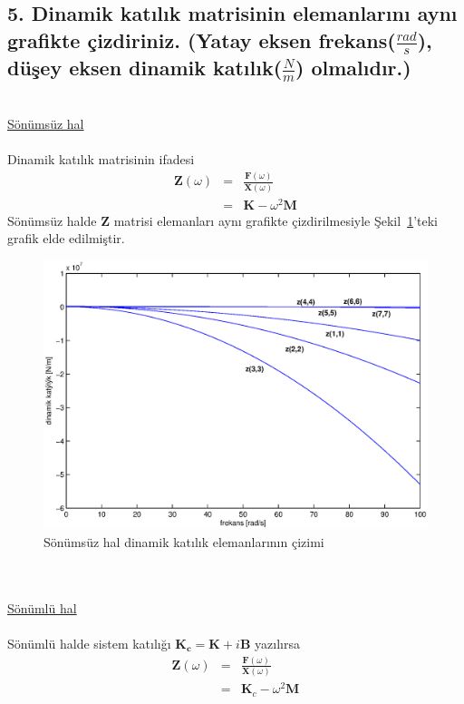 \documentclass[a4paper]{report}
\begin{document}
\subsection*{5. Dinamik katılık matrisinin elemanlarını aynı grafikte çizdiriniz. (Yatay eksen frekans($\frac{rad}{s}$), düşey eksen dinamik katılık($\frac{N}{m}$) olmalıdır.)}~\\
\underline{Sönümsüz hal}\\~\\
Dinamik katılık matrisinin ifadesi
\begin{eqnarray*}
\mathbf{Z}\left(\omega\right)&=&\frac{\mathbf{F}\left(\omega\right)}{\mathbf{X}\left(\omega\right)}\\
&=&\mathbf{K}-\omega^2\mathbf{M}
\end{eqnarray*}
Sönümsüz halde $\mathbf{Z}$ matrisi elemanları aynı grafikte çizdirilmesiyle Şekil~\ref{fig:dinamikkatilik}'teki grafik elde edilmiştir.
\begin{figure}[th!]
\shorthandoff{=}
\centerline{
{\includegraphics[width=1.3\textwidth]{./dinamikkatilik.eps}}}
\caption[Dinamik katılık]{Sönümsüz hal dinamik katılık elemanlarının çizimi}
\label{fig:dinamikkatilik}
\end{figure}\\
~\\
\underline{Sönümlü hal}\\~\\
Sönümlü halde sistem katılığı $\mathbf{K_c}=\mathbf{K}+i\mathbf{B}$ yazılırsa
\begin{eqnarray*}
\mathbf{Z}\left(\omega\right)&=&\frac{\mathbf{F}\left(\omega\right)}{\mathbf{X}\left(\omega\right)}\\
&=&\mathbf{K}_c-\omega^2\mathbf{M}
\end{eqnarray*}
\end{document}
